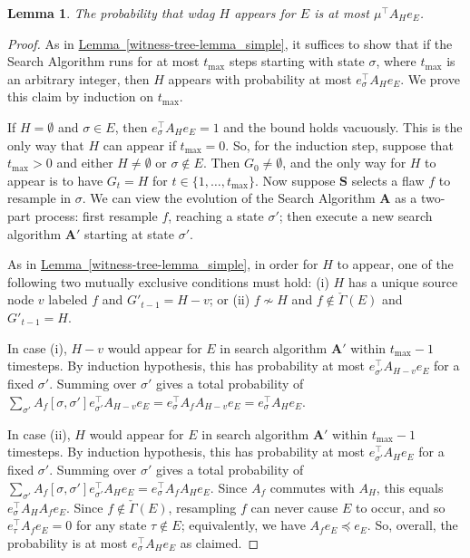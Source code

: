 \documentclass[11pt]{article}
\newcommand{\expref}[2]{\texorpdfstring{\hyperref[#2]{#1~\ref{#2}}}{#1~\ref{#2}}}
\newtheorem{lemma}[theorem]{Lemma}
\begin{document}
\begin{lemma}
  \label{witness-tree-lemma_simple2}
The probability that wdag $H$ appears for $E$ is at most $\mu^{\top} A_H e_E$.
\end{lemma}
\begin{proof}
As in \expref{Lemma}{witness-tree-lemma_simple}, it suffices to show that if the Search Algorithm runs for at most $t_{\max}$ steps starting with state $\sigma$, where $t_{\max}$ is an arbitrary integer, then $H$ appears with probability at most $e_{\sigma}^{\top} A_H e_E.$ We prove this claim by induction on $t_{\max}$. 


If $H = \emptyset$ and $\sigma \in E$, then $e_{\sigma}^{\top} A_H e_E = 1$ and the bound holds vacuously. This is the only way that $H$ can appear if $t_{\max} = 0$. So, for the induction step, suppose that $t_{\max} > 0$ and either $H \neq \emptyset$ or $\sigma \not \in E$.  Then $G_0 \neq \emptyset$, and the only way for $H$ to appear is to have $G_t = H$ for $t \in \{1, \dots,  t_{\max}  \}$. Now suppose $\mathbf S$ selects a flaw $f$ to resample in $\sigma$. We can view the evolution of the Search Algorithm $\mathbf A$ as a two-part process: first resample $f$, reaching a state $\sigma'$; then execute a new search algorithm $\mathbf A'$ starting at state $\sigma'$.

 As in \expref{Lemma}{witness-tree-lemma_simple}, in order for $H$ to appear, one of the following two mutually exclusive conditions must hold: (i) $H$ has a unique source node $v$ labeled $f$ and $G'_{t-1} = H - v$; or  (ii) $f \not \sim H$ and $f \notin \check \Gamma(E)$ and $G'_{t-1} = H$. 

In case (i),  $H - v$ would appear for $E$ in search algorithm $\mathbf A'$ within $t_{\max}-1$ timesteps. By induction hypothesis, this has  probability at most $e_{\sigma'}^{\top} A_{H-v} e_E$ for a fixed $\sigma'$. Summing over $\sigma'$ gives a total probability of  $\sum_{\sigma'} A_f[\sigma, \sigma'] e_{\sigma'}^{\top} A_{H-v} e_E = e_{\sigma}^{\top} A_f  A_{H-v} e_E = e_{\sigma}^{\top} A_H e_E$.

In case (ii),  $H $ would appear for $E$ in search algorithm $\mathbf A'$ within $t_{\max}-1$ timesteps. By induction hypothesis, this has  probability at most $e_{\sigma'}^{\top} A_H e_E$ for a fixed $\sigma'$. Summing over $\sigma'$ gives a total probability of  $\sum_{\sigma'} A_f[\sigma, \sigma'] e_{\sigma'}^{\top} A_{H} e_E = e_{\sigma}^{\top} A_f  A_{H} e_E$. Since $A_f$ commutes with $A_H$, this equals $e_{\sigma}^{\top} A_{H} A_f e_E$. Since $f \notin \check \Gamma(E)$, resampling $f$ can never cause $E$ to occur, and so $e_{\tau}^{\top} A_f e_E = 0$ for any state $\tau \notin E$; equivalently, we have $A_f e_E \preceq e_E$. So, overall, the probability is at most $e_{\sigma}^{\top} A_{H} e_E$ as claimed. 
\end{proof}
\end{document}
